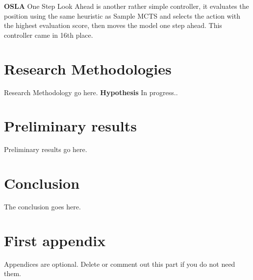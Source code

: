 \documentclass[journal]{IEEEtran}
\begin{document}
		\textbf{OSLA}
			One Step Look Ahead is another rather simple controller, it evaluates the position using the same heuristic as Sample MCTS and selects the action with the highest evaluation score, then moves the model one step ahead. This controller came in 16th place.






		

		




	
	
		
	
\section{Research Methodologies}	
	Research Methodology go here.
\textbf{Hypothesis}
	In progress..


	
\section{Preliminary results}
	Preliminary results go here.


\section{Conclusion}
	The conclusion goes here.






\appendices
\section{First appendix}
Appendices are optional. Delete or comment out this part if you do not need them.

\end{document}
